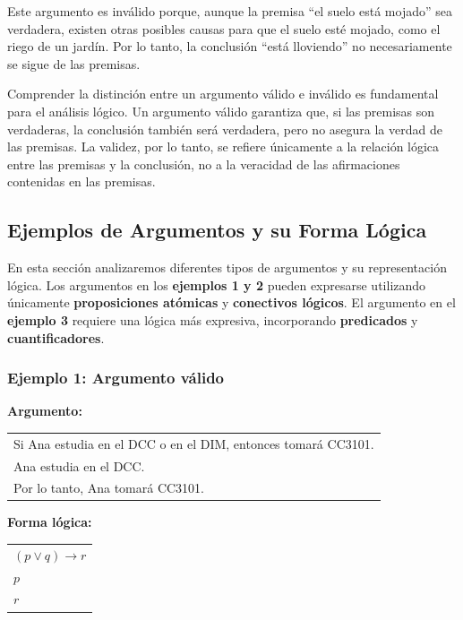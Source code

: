 Este argumento es inválido porque, aunque la premisa ``el suelo está mojado'' sea verdadera, existen otras posibles causas para que el suelo esté mojado, como el riego de un jardín. Por lo tanto, la conclusión ``está lloviendo'' no necesariamente se sigue de las premisas.

Comprender la distinción entre un argumento válido e inválido es fundamental para el análisis lógico. Un argumento válido garantiza que, si las premisas son verdaderas, la conclusión también será verdadera, pero no asegura la verdad de las premisas. La validez, por lo tanto, se refiere únicamente a la relación lógica entre las premisas y la conclusión, no a la veracidad de las afirmaciones contenidas en las premisas.

\subsection{Ejemplos de Argumentos y su Forma Lógica}

En esta sección analizaremos diferentes tipos de argumentos y su representación lógica.
Los argumentos en los \textbf{ejemplos 1 y 2} pueden expresarse utilizando únicamente \textbf{proposiciones atómicas} y \textbf{conectivos lógicos}.
El argumento en el \textbf{ejemplo 3} requiere una lógica más expresiva, incorporando \textbf{predicados} y \textbf{cuantificadores}.



\subsubsection{Ejemplo 1: Argumento válido}
\textbf{Argumento:}

\begin{center}
\begin{tabular}{l}
Si Ana estudia en el DCC o en el DIM, entonces tomará CC3101.\\
Ana estudia en el DCC.\\
\hline
Por lo tanto, Ana tomará CC3101.
\end{tabular}
\end{center}

\textbf{Forma lógica:}

\begin{center}
\begin{tabular}{l}
$(p \vee q) \rightarrow r$ \\
$p$ \\
\hline
$r$
\end{tabular}
\end{center}


